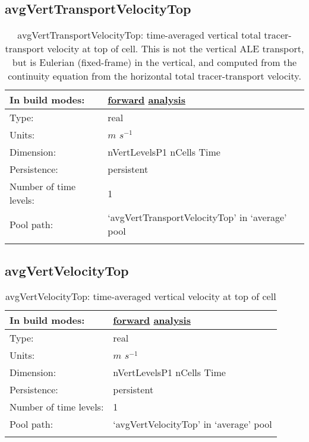 \subsection[avgVertTransportVelocityTop]{avgVertTransportVelocityTop}
\label{subsec:var_sec_average_avgVertTransportVelocityTop}
\begin{center}
\begin{longtable}{| p{2.0in} | p{4.0in} |}
        \hline 
        In build modes: & \hyperref[subsec:forward_var_tab_average]{forward} \hyperref[subsec:analysis_var_tab_average]{analysis} \\
        \hline 
        Type: & real \\
        \hline 
        Units: & $m$ $s^{-1}$ \\
        \hline 
        Dimension: & nVertLevelsP1 nCells Time \\
        \hline 
        Persistence: & persistent \\
        \hline 
        Number of time levels: & 1 \\
        \hline 
            Pool path: & `avgVertTransportVelocityTop' in `average' pool \\
		 \hline 
    \caption{avgVertTransportVelocityTop: time-averaged vertical total tracer-transport velocity at top of cell.  This is not the vertical ALE transport, but is Eulerian (fixed-frame) in the vertical, and computed from the continuity equation from the horizontal total tracer-transport velocity.}
\end{longtable}
\end{center}
\subsection[avgVertVelocityTop]{avgVertVelocityTop}
\label{subsec:var_sec_average_avgVertVelocityTop}
\begin{center}
\begin{longtable}{| p{2.0in} | p{4.0in} |}
        \hline 
        In build modes: & \hyperref[subsec:forward_var_tab_average]{forward} \hyperref[subsec:analysis_var_tab_average]{analysis} \\
        \hline 
        Type: & real \\
        \hline 
        Units: & $m$ $s^{-1}$ \\
        \hline 
        Dimension: & nVertLevelsP1 nCells Time \\
        \hline 
        Persistence: & persistent \\
        \hline 
        Number of time levels: & 1 \\
        \hline 
            Pool path: & `avgVertVelocityTop' in `average' pool \\
		 \hline 
    \caption{avgVertVelocityTop: time-averaged vertical velocity at top of cell}
\end{longtable}
\end{center}
